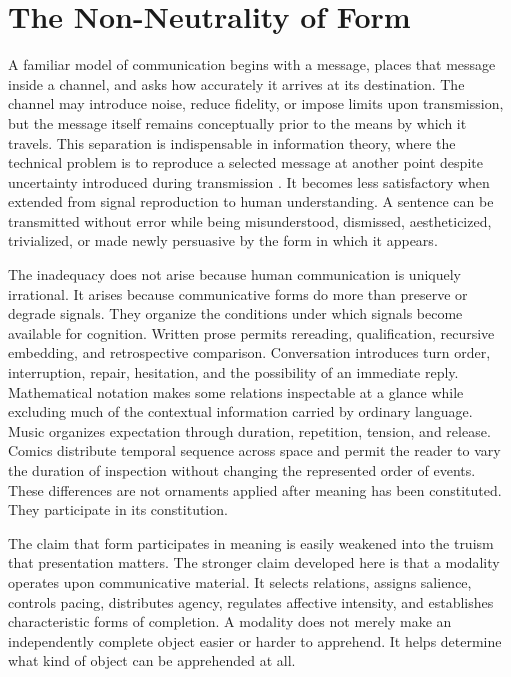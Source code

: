 \documentclass[11pt]{article}
\begin{document}
\newpage

\section{The Non-Neutrality of Form}

A familiar model of communication begins with a message, places that message
inside a channel, and asks how accurately it arrives at its destination. The
channel may introduce noise, reduce fidelity, or impose limits upon
transmission, but the message itself remains conceptually prior to the means
by which it travels. This separation is indispensable in information theory,
where the technical problem is to reproduce a selected message at another
point despite uncertainty introduced during transmission
\citep{shannon1948}. It becomes less satisfactory when extended from signal
reproduction to human understanding. A sentence can be transmitted without
error while being misunderstood, dismissed, aestheticized, trivialized, or
made newly persuasive by the form in which it appears.

The inadequacy does not arise because human communication is uniquely
irrational. It arises because communicative forms do more than preserve or
degrade signals. They organize the conditions under which signals become
available for cognition. Written prose permits rereading, qualification,
recursive embedding, and retrospective comparison. Conversation introduces
turn order, interruption, repair, hesitation, and the possibility of an
immediate reply. Mathematical notation makes some relations inspectable at a
glance while excluding much of the contextual information carried by ordinary
language. Music organizes expectation through duration, repetition, tension,
and release. Comics distribute temporal sequence across space and permit the
reader to vary the duration of inspection without changing the represented
order of events. These differences are not ornaments applied after meaning
has been constituted. They participate in its constitution.

The claim that form participates in meaning is easily weakened into the
truism that presentation matters. The stronger claim developed here is that a
modality operates upon communicative material. It selects relations, assigns
salience, controls pacing, distributes agency, regulates affective intensity,
and establishes characteristic forms of completion. A modality does not
merely make an independently complete object easier or harder to apprehend. It
helps determine what kind of object can be apprehended at all.
\end{document}
